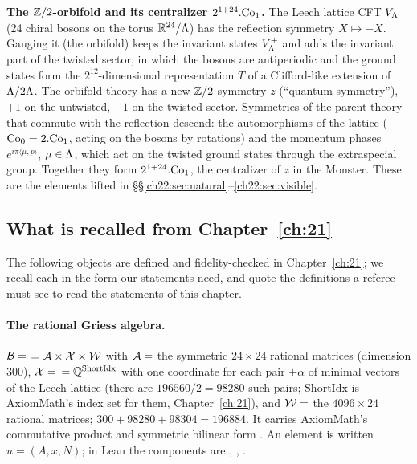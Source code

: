 \begin{physics}
\textbf{The ${\mathbb{Z}}/2$-orbifold and its centralizer $2^{1+24}.\mathrm{Co}_1$.}  The Leech lattice CFT $V_{\Lambda}$
(24 chiral bosons on the torus $\mathbb{R}^{24}/{\Lambda}$) has the reflection symmetry $X\mapsto-X$.  Gauging it (the orbifold)
keeps the invariant states $V_{\Lambda}^+$ and adds the invariant part of the twisted sector, in which the bosons are
antiperiodic and the ground states form the $2^{12}$-dimensional representation $T$ of a Clifford-like extension
of ${\Lambda}/2{\Lambda}$.  The orbifold theory has a new ${\mathbb{Z}}/2$ symmetry $z$ (``quantum symmetry''), $+1$ on the
untwisted, $-1$ on the twisted sector.  Symmetries of the parent theory that commute with the reflection descend:
the automorphisms of the lattice ($\mathrm{Co}_0=2.\mathrm{Co}_1$, acting on the bosons by rotations) and
the momentum phases $e^{i\pi\langle\mu,p\rangle}$, $\mu\in{\Lambda}$, which act on the twisted ground states through the
extraspecial group.  Together they form $2^{1+24}.\mathrm{Co}_1$, the centralizer of $z$ in the Monster.  These
are the elements lifted in \S\S\ref{ch22:sec:natural}--\ref{ch22:sec:visible}.
\end{physics}

\subsection{What is recalled from Chapter~\ref{ch:21}}\label{ch22:sec:recall}

The following objects are defined and fidelity-checked in Chapter~\ref{ch:21}; we recall each in the form our
statements need, and quote the definitions a referee must see to read the statements of this chapter.

\paragraph{The rational Griess algebra.}  $\mathcal{B}=$  $=\mathcal{A}\times\mathcal{X}\times
\mathcal{W}$ with $\mathcal{A}=$  the symmetric $24\times24$ rational matrices (dimension $300$),
$\mathcal{X}=$  $={\mathbb{Q}}^{\mathrm{ShortIdx}}$ with one coordinate for each pair $\pm\alpha$ of minimal
vectors of the Leech lattice (there are $196560/2=98280$ such pairs; $\mathrm{ShortIdx}$ is AxiomMath's index set for
them, Chapter~\ref{ch:21}), and $\mathcal{W}=$ 
the $4096\times24$ rational matrices; $300+98280+98304=196884$.  It carries AxiomMath's commutative product
 and symmetric bilinear form .  An element is written $u=(A,x,N)$; in Lean the components
are , , .

